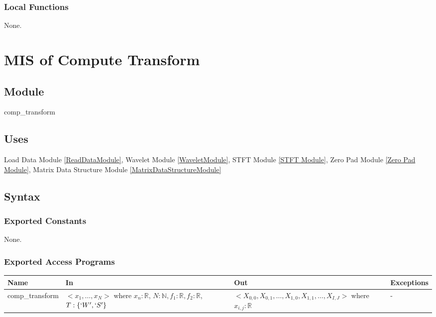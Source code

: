 \documentclass[12pt, titlepage]{article}
\begin{document}

\subsubsection{Local Functions}
None.
 
  \newpage
\section{MIS of Compute Transform} \label{CompTransformModule} 



\subsection{Module}
comp\_transform

\subsection{Uses}
Load Data Module \ref{ReadDataModule}, Wavelet Module \ref{WaveletModule}, STFT Module \ref{STFT Module}, Zero Pad Module \ref{Zero Pad Module}, Matrix Data Structure Module \ref{MatrixDataStructureModule}
\subsection{Syntax}

\subsubsection{Exported Constants}
None.
\subsubsection{Exported Access Programs}

\begin{center}
\begin{tabular}{p{3cm} p{4cm} p{5cm} p{1cm}}
\hline
\textbf{Name} & \textbf{In} & \textbf{Out} & \textbf{Exceptions} \\
\hline
comp\_transform & $<x_1,\dots,x_N>$ where $ x_n:\mathbb{R}$, $N:\mathbb{N}, f_1:
\mathbb{R}, f_2 : \mathbb{R}$, $T: \{`W',`S'\}$ & $<X_{0,0},X_{0,1},\dots, X_{1,0},X_{1,1},\dots, X_{I,J}>$ where $ x_{i,j}:\mathbb{R}$ & - \\
\hline
\end{tabular}
\end{center}
\end{document}
